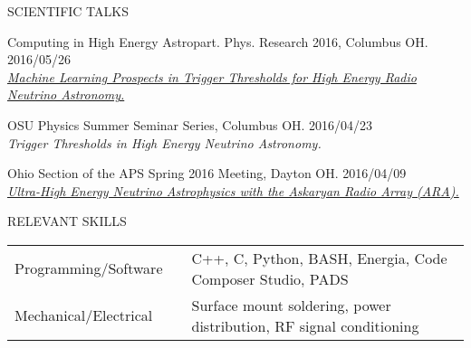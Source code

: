 \documentclass{resume} %
\begin{document}
\begin{rSection}{SCIENTIFIC TALKS}
\begin{etaremune}
\item Computing in High Energy Astropart. Phys. Research 2016, Columbus OH. \hfill 2016/05/26 \\
\href{http://ccapp.osu.edu/workshops/CHEAPR2016/workshop.html}{\em Machine Learning Prospects in Trigger Thresholds for High Energy Radio Neutrino Astronomy.}

\item OSU Physics Summer Seminar Series, Columbus OH. \hfill 2016/04/23 \\
{\em Trigger Thresholds in High Energy Neutrino Astronomy.} 

\item Ohio Section of the APS Spring 2016 Meeting, Dayton OH. \hfill 2016/04/09 \\
\href{http://meetings.aps.org/Meeting/OSS16/Session/D3.6}{\em Ultra-High Energy Neutrino Astrophysics with the Askaryan Radio Array (ARA).} 
\end{etaremune}


\end{rSection}
\vspace{-0.10cm}
\newpage
\begin{rSection}{RELEVANT SKILLS}
\begin{tabular}{@{}l l l@{}}
Programming/Software & & C++, C, Python, BASH, Energia, Code Composer Studio, PADS \\ 
Mechanical/Electrical & & Surface mount soldering, power distribution, RF signal conditioning  \\ 
\end{tabular}
\end{rSection}
\end{document}

